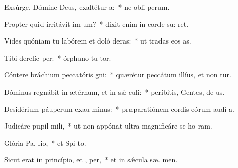 \item Exsúrge, Dómine Deus, exaltétur  a:~* ne obli perum.
\item Propter quid irritávit ím um?~* dixit enim in corde su:  ret.
\item Vides quóniam tu labórem et doló deras:~* ut tradas eos   as.
\item Tibi derelíc  per:~* órphano tu  tor.
\item Cóntere bráchium peccatóris  gni:~* quærétur peccátum illíus, et non tur.
\item Dóminus regnábit in ætérnum, et in sǽ culi:~* períbitis, Gentes, de  us.
\item Desidérium páuperum exau minus:~* præparatiónem cordis eórum audí  a.
\item Judicáre pupíl  mili,~* ut non appónat ultra magnificáre se ho  ram.
\item Glória Pa,  lio,~* et Spi to.
\item Sicut erat in princípio, et ,  per,~* et in sǽcula sæ. men.
